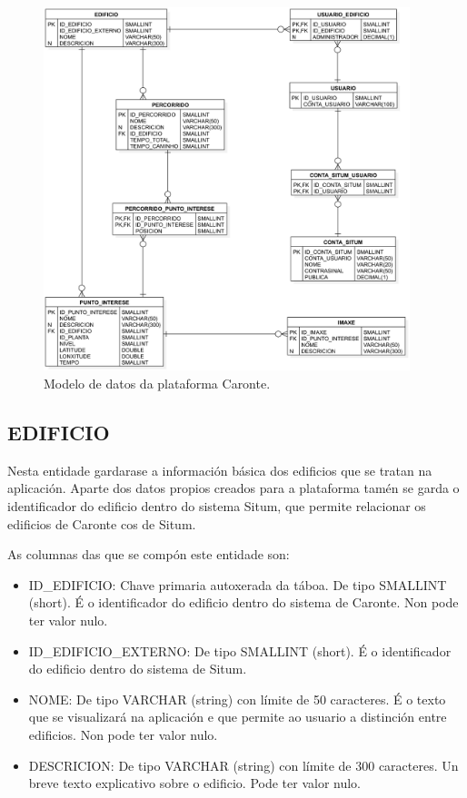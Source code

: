 \begin{figure}[tb] 
	\begin{center}
		\includegraphics[width=0.95\textwidth]{figures/BD/diagramaEntidadeRelacion}
		\caption{Modelo de datos da plataforma Caronte.}
		\label{fig:modelo_datos}
	\end{center}
\end{figure}

\subsection{EDIFICIO}
Nesta entidade gardarase a información básica dos edificios que se tratan na aplicación. Aparte dos datos propios creados para a plataforma tamén se garda o identificador do edificio dentro do sistema Situm, que permite relacionar os edificios de Caronte cos de Situm.

As columnas das que se compón este entidade son:
\begin{itemize}
	\item ID\_EDIFICIO: Chave primaria autoxerada da táboa. De tipo SMALLINT (short). É o identificador do edificio dentro do sistema de Caronte. Non pode ter valor nulo.
	\item ID\_EDIFICIO\_EXTERNO: De tipo SMALLINT (short). É o identificador do edificio dentro do sistema de Situm.
	\item NOME: De tipo VARCHAR (string) con límite de 50 caracteres. É o texto que se visualizará na aplicación e que permite ao usuario a distinción entre edificios. Non pode ter valor nulo.
	\item DESCRICION: De tipo VARCHAR (string) con límite de 300 caracteres. Un breve texto explicativo sobre o edificio. Pode ter valor nulo.
\end{itemize}

